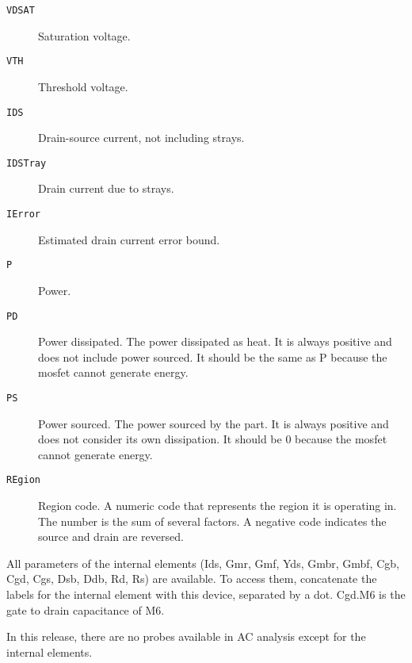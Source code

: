 \begin{description}
\item[{\tt VDSAT}] Saturation voltage.

\item[{\tt VTH}] Threshold voltage.

\item[{\tt IDS}] Drain-source current, not including strays.

\item[{\tt IDSTray}] Drain current due to strays.

\item[{\tt IError}] Estimated drain current error bound.

\item[{\tt P}] Power.

\item[{\tt PD}]
Power dissipated.  The power dissipated as heat.  It is always
positive and does not include power sourced.  It should be the same as
P because the mosfet cannot generate energy.

\item[{\tt PS}]
Power sourced.  The power sourced by the part.  It is always positive
and does not consider its own dissipation.  It should be 0 because the
mosfet cannot generate energy.

\item[{\tt REgion}]
Region code.  A numeric code that represents the region it is
operating in.  The number is the sum of several factors.  A negative
code indicates the source and drain are reversed.


\end{description}

All parameters of the internal elements (Ids, Gmr, Gmf, Yds, Gmbr,
Gmbf, Cgb, Cgd, Cgs, Dsb, Ddb, Rd, Rs) are available.  To access them,
concatenate the labels for the internal element with this device,
separated by a dot.  Cgd.M6 is the gate to drain capacitance of M6.

In this release, there are no probes available in AC analysis except
for the internal elements.
